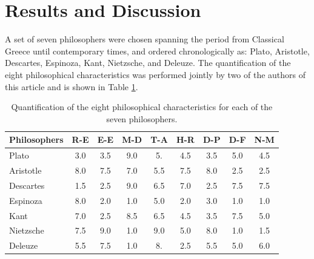 \documentclass[%
 aip,
 jmp,%
 amsmath,amssymb,
 reprint,%
]{revtex4-1}
\begin{document}
\section{Results and Discussion}

A set of seven philosophers were chosen spanning the period from
Classical Greece until contemporary times, and ordered chronologically
as: Plato, Aristotle, Descartes, Espinoza, Kant, Nietzsche, and
Deleuze.  The quantification of the eight philosophical
characteristics was performed jointly by two of the authors of this
article and is shown in Table \ref{tab:tableA}.

\begin{table}%
\caption{\label{tab:tableA}Quantification of the
eight philosophical characteristics for each of the seven philosophers.  }

\begin{ruledtabular}
\begin{tabular}{|l||c|c|c|c|c|c|c|c|}

Philosophers & R-E & E-E & M-D & T-A & H-R & D-P & D-F & N-M \\ \hline

Plato  & 3.0 &   3.5 &   9.0  &   5.  &   4.5 &   3.5 &   5.0 &   4.5 \\

Aristotle & 8.0 &   7.5 &   7.0  &   5.5 &   7.5 &   8.0 &   2.5 &   2.5 \\

Descartes & 1.5 &   2.5 &   9.0  &   6.5 &   7.0 &   2.5 &   7.5 &   7.5 \\

Espinoza     & 8.0 &   2.0 &   1.0  &   5.0 &   2.0 &   3.0 &   1.0 &   1.0 \\

Kant      & 7.0 &   2.5 &   8.5  &   6.5 &   4.5 &   3.5 &   7.5 &   5.0 \\

Nietzsche & 7.5 &   9.0 &   1.0  &   9.0 &   5.0 &   8.0 &   1.0 &   1.5 \\

Deleuze   & 5.5 &   7.5 &   1.0  &   8.  &   2.5 &   5.5 &   5.0 &   6.0 \\
\end{tabular}
\end{ruledtabular}
\end{table}
\end{document}

